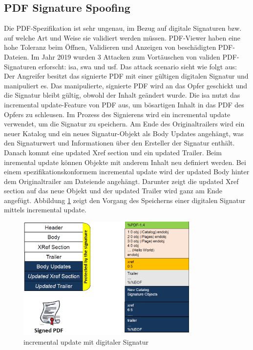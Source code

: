 \subsection{PDF Signature Spoofing}
Die PDF-Spezifikation ist sehr ungenau, im Bezug auf digitale Signaturen bzw. auf welche Art und Weise sie validiert werden müssen. PDF-Viewer haben eine hohe Toleranz beim Öffnen, Validieren und Anzeigen von beschädigten PDF-Dateien. Im Jahr 2019 wurden 3 Attacken zum Vortäuschen von validen PDF-Signaturen erforscht: \gls{isa}, \gls{swa} und \gls{usf}. Das attack scenario sieht wie folgt aus: Der Angreifer besitzt das signierte PDF mit einer gültigen digitalen Signatur und manipuliert es. Das manipulierte, signierte PDF wird an das Opfer geschickt und die Signatur bleibt gültig, obwohl der Inhalt geändert wurde. Die \gls{isa} nutzt das incremental update-Feature von PDF aus, um bösartigen Inhalt in das PDF des Opfers zu schleusen. Im Prozess des Signierens wird ein incremental update verwendet, um die Signatur zu speichern. Am Ende des Originaltrailers wird ein neuer Katalog und ein neues Signatur-Objekt als Body Updates angehängt, was den Signaturwert und Informationen über den Ersteller der Signatur enthält. Danach kommt eine updated Xref section und ein updated Trailer. Beim inremental update können Objekte mit anderem Inhalt neu definiert werden. Bei einem spezifikationskonformem incremental update wird der updated Body hinter dem Originaltrailer am Dateiende angehängt. Darunter zeigt die updated Xref section auf das neue Objekt und der updated Trailer wird ganz am Ende angefügt. Abbildung \ref{fig:incr-update} zeigt den Vorgang des Speicherns einer digitalen Signatur mittels incremental update.

\begin{figure}[!htbp]
	\centering
	\includegraphics[width=0.8\textwidth]{"images/dig_sig_incr_up.png"}
	\caption{incremental update mit digitaler Signatur \cite{ccc-break-pdf-slides}}
	\label{fig:incr-update}
\end{figure}

